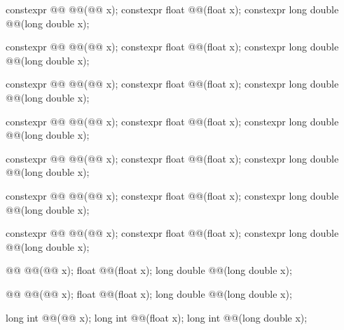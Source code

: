 \begin{codeblock}
{  constexpr @@ @@(@@ x);
  constexpr float               @@(float x);
  constexpr long double         @@(long double x);

  constexpr @@ @@(@@ x);
  constexpr float               @@(float x);
  constexpr long double         @@(long double x);

  constexpr @@ @@(@@ x);
  constexpr float               @@(float x);
  constexpr long double         @@(long double x);

  constexpr @@ @@(@@ x);
  constexpr float               @@(float x);
  constexpr long double         @@(long double x);

  constexpr @@ @@(@@ x);
  constexpr float               @@(float x);
  constexpr long double         @@(long double x);

  constexpr @@ @@(@@ x);
  constexpr float               @@(float x);
  constexpr long double         @@(long double x);

  constexpr @@ @@(@@ x);
  constexpr float               @@(float x);
  constexpr long double         @@(long double x);

  @@ @@(@@ x);
  float               @@(float x);
  long double         @@(long double x);

  @@ @@(@@ x);
  float               @@(float x);
  long double         @@(long double x);

  long int @@(@@ x);
  long int @@(float x);
  long int @@(long double x);

}
\end{codeblock}
